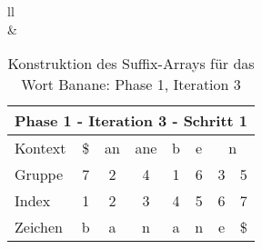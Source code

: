 \begin{table}[H]
\begin{adjustbox}{max width=\textwidth}
\begin{tabular}{ll}
\\
&
\\

\begin{tabular}{lccccccc}
\multicolumn{8}{l}{Phase 1 - Iteration 3 - Schritt 1}                                                                                                                                  \\ \hline
\multicolumn{1}{l|}{Kontext} & \multicolumn{1}{c|}{\$} & \multicolumn{1}{c|}{an} & \multicolumn{1}{c|}{ane} & \multicolumn{1}{c|}{b} & \multicolumn{1}{c|}{e} & \multicolumn{2}{c}{n} \\
\multicolumn{1}{l|}{Gruppe}  & \multicolumn{1}{c|}{7}  & \multicolumn{1}{c|}{2}  & \multicolumn{1}{c|}{4}   & \multicolumn{1}{c|}{1} & \multicolumn{1}{c|}{6} & 3         & 5          \\ \hline
\multicolumn{1}{l|}{Index}   & 1                       & 2                       & 3                        & 4                      & 5                      & 6         & 7          \\
\multicolumn{1}{l|}{Zeichen} & b                       & a                       & n                        & a                      & n                      & e         & \$        
\end{tabular}

\end{tabular}
\end{adjustbox}

\caption[Konstruktion des Suffix-Arrays für das Wort Banane: Phase 1, Iteration 3]{Konstruktion des Suffix-Arrays für das Wort Banane: Phase 1, Iteration 3}
\label{fig_banane_1_3} 
\end{table}
